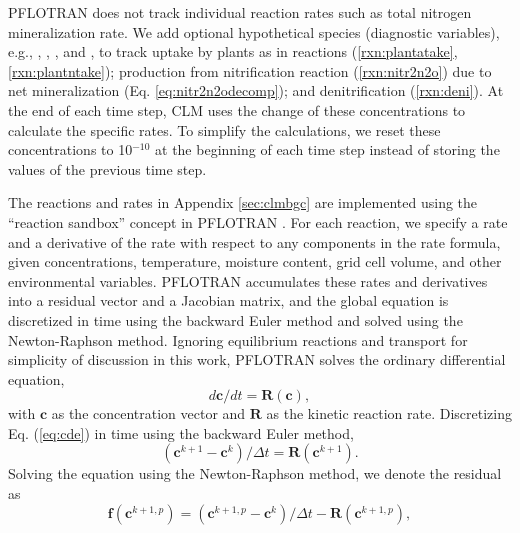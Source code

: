 \documentclass[gmd, manuscript]{copernicus}
\begin{document}
PFLOTRAN does not track individual reaction rates such as total nitrogen
mineralization rate. We add optional hypothetical species (diagnostic variables), e.g.,
, , , and , to track   uptake by
plants as in reactions (\ref{rxn:plantatake},\ref{rxn:plantntake});  production from
nitrification reaction (\ref{rxn:nitr2n2o}) due to net mineralization (Eq.
\ref{eq:nitr2n2odecomp}); and denitrification (\ref{rxn:deni}).
At the end of each time step, CLM uses the change of these
concentrations to calculate the specific rates. To simplify the calculations, we
reset these concentrations to 10$^{-10}$ at the beginning of each time step
instead of storing the values of the previous time step. 

The reactions and rates in Appendix \ref{sec:clmbgc}
are implemented using the ``reaction sandbox'' concept in PFLOTRAN
\citep{Lichtner2015}. For each reaction, we specify a rate and a derivative of
the rate with respect to any components in the rate formula, given
concentrations, temperature, moisture content, grid cell volume, and other
environmental variables. PFLOTRAN accumulates these rates and derivatives into
a residual vector and a Jacobian matrix, and the global equation is discretized
in time using the backward Euler method and solved using the Newton-Raphson
method.
Ignoring equilibrium reactions and transport for simplicity of discussion in
this work, PFLOTRAN solves the ordinary differential equation,
\begin{equation}
\label{eq:cde}
{d \mathbf{c}}/{d t} = \mathbf{R}(\mathbf{c}),
\end{equation}
with $\mathbf{c}$ as the concentration vector and $\mathbf{R}$ as the kinetic reaction rate. 
Discretizing Eq. (\ref{eq:cde}) in time using the backward Euler method, 
\begin{equation}
{(\mathbf{c}^{k+1} - \mathbf{c}^k)}/{\Delta t} = \mathbf{R}(\mathbf{c}^{k+1}).
\label{eq:cdedis}
\end{equation}
Solving the equation  using the Newton-Raphson method, we denote the residual as
\begin{equation}
\mathbf{f}(\mathbf{c}^{k+1,p} )=(\mathbf{c}^{k+1,p}-\mathbf{c}^k)/\Delta t-\mathbf{R}(\mathbf{c}^{k+1,p}),
\label{eq:residual}
\end{equation}
\end{document}
